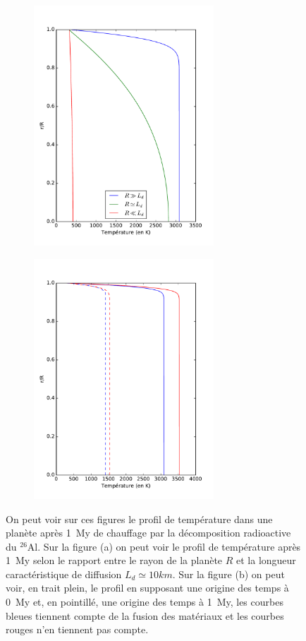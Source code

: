 \documentclass[10pt,a4paper]{article}
\numberwithin{equation}{section}
\begin{document}
\begin{figure}
\centering
\begin{subfigure}{.49\textwidth}
  \centering
  \includegraphics[height=9cm]{./figures/graph_sim1_fig2.pdf}
  \caption{}
  \label{fig1:sub1}
\end{subfigure}
\begin{subfigure}{.5\textwidth}
  \centering
  
  \includegraphics[height=9cm]{./figures/graph_sim1_fig1.pdf}
  \caption{}
  \label{fig1:sub2}
\end{subfigure}%

\caption{On peut voir sur ces figures le profil de température dans une planète après \SI{1}{My} de chauffage par la décomposition radioactive du $^{26}$Al. Sur la figure (a) on peut voir le profil de température après \SI{1}{My} selon le rapport entre le rayon de la planète $R$ et la longueur caractéristique de diffusion $L_d \simeq 10 km $.  Sur la figure (b) on peut voir, en trait plein, le profil en supposant une origine des temps à \SI{0}{My} et, en pointillé, une origine des temps à \SI{1}{My}, les courbes bleues tiennent compte de la fusion des matériaux et les courbes rouges n'en tiennent pas compte.}
\label{fig1}
\end{figure}
\end{document}
